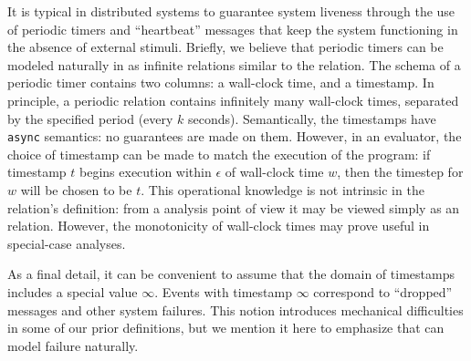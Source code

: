 
It is typical in distributed systems to guarantee system liveness through the use of periodic timers and ``heartbeat'' messages that keep the system functioning in the absence of external stimuli.  Briefly, we believe that periodic timers can be modeled naturally in \lang as infinite relations similar to the \lang {} relation.  The schema of a periodic timer contains two columns: a wall-clock time, and a \lang timestamp.  In principle, a periodic relation contains infinitely many wall-clock times, separated by the specified period (every $k$ seconds).  Semantically, the \lang timestamps have {\tt async} semantics: no guarantees are made on them.  However, in an evaluator, the choice of timestamp can be made to match the execution of the program: if \lang timestamp $t$ begins execution within $\epsilon$ of wall-clock time $w$, then the \lang timestep for $w$ will be chosen to be $t$.  This operational knowledge is not intrinsic in the relation's definition: from a \lang analysis point of view it may be viewed simply as an  relation.  However, the monotonicity of wall-clock times may prove useful in special-case analyses.

As a final detail, it can be convenient to assume that the domain of \lang
timestamps includes a special value $\infty$.  Events with 
timestamp $\infty$ correspond to ``dropped'' messages and other system failures.
This notion introduces mechanical difficulties in some of our prior definitions,
but we mention it here to emphasize that \lang can model failure naturally.
